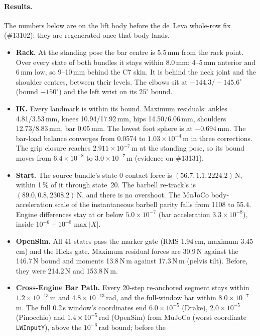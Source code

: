 \documentclass[11pt,a4paper]{article}
\begin{document}
\paragraph{Results.} The numbers below are on the lift body before the de~Leva
whole-row fix (\#13102); they are regenerated once that body lands.
\begin{itemize}[nosep]
\item \textbf{Rack.} At the standing pose the bar centre is 5.5\,mm from the
  rack point. Over every state of both bundles it stays within 8.0\,mm:
  4--5\,mm anterior and 6\,mm low, so 9--10\,mm behind the C7 skin. It is
  behind the neck joint and the shoulder centres, between their levels. The
  elbows sit at $-144.3/-145.6^\circ$ (bound $-150^\circ$) and the left
  wrist on its $25^\circ$ bound.
\item \textbf{IK.} Every landmark is within its bound. Maximum residuals:
  ankles 4.81/3.53\,mm, knees 10.94/17.92\,mm, hips 14.50/6.06\,mm,
  shoulders 12.73/8.83\,mm, bar 0.05\,mm. The lowest foot sphere is at
  $-0.694$\,mm. The bar-load balance converges from 0.0574 to
  $1.03\times10^{-4}$\,m in three corrections. The grip closure reaches
  $2.911\times10^{-7}$\,m at the standing pose, so its bound moves from
  $6.4\times10^{-8}$ to $3.0\times10^{-7}$\,m (evidence on \#13131).
\item \textbf{Start.} The source bundle's state-0 contact force is
  $(56.7, 1.1, 2224.2)$\,N, within 1\,\% of it through state~20. The
  barbell re-track's is $(89.0, 0.8, 2308.2)$\,N, and there is no overshoot.
  The MuJoCo body-acceleration scale of the instantaneous barbell parity
  falls from 1108 to 55.4. Engine differences stay at or below
  $5.0\times10^{-7}$ (bar acceleration $3.3\times10^{-8}$), inside
  $10^{-6} + 10^{-8}\max|X|$.
\item \textbf{OpenSim.} All 41 states pass the marker gate (RMS 1.94\,cm,
  maximum 3.45\,cm) and the Hicks gate. Maximum residual forces are
  30.9\,N against the 146.7\,N bound and moments 13.8\,N\,m against
  17.3\,N\,m (pelvis tilt). Before, they were 214.2\,N and 153.8\,N\,m.
\item \textbf{Cross-Engine Bar Path.} Every 20-step re-anchored segment
  stays within $1.2\times10^{-13}$\,m and $4.8\times10^{-13}$\,rad, and the
  full-window bar within $8.0\times10^{-7}$\,m. The full 0.2\,s window's
  coordinates end $6.0\times10^{-5}$ (Drake), $2.0\times10^{-5}$
  (Pinocchio) and $1.4\times10^{-5}$\,rad (OpenSim) from MuJoCo (worst
  coordinate \texttt{LWInputY}), above the $10^{-6}$\,rad bound; before the

\end{itemize}
\end{document}
